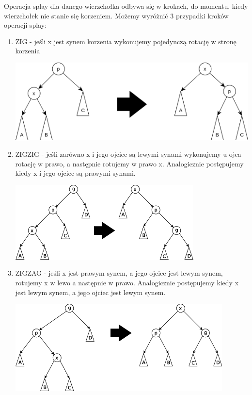 \documentclass[declaration,shortabstract]{iithesis}
\begin{document}
Operacja splay dla danego wierzchołka odbywa się w krokach, do momentu, kiedy wierzchołek nie stanie się korzeniem. Możemy wyróżnić 3 przypadki kroków operacji splay: 
\begin{enumerate} 

\item{ZIG - jeśli x jest synem korzenia wykonujemy pojedynczą rotację w stronę korzenia} 

\includegraphics[scale = 0.75]{Splay_tree_zig.png}

\item{ZIGZIG - jeśli zarówno x i jego ojciec są lewymi synami wykonujemy u ojca rotację w prawo, a następnie rotujemy w prawo x. Analogicznie postępujemy kiedy x i jego ojciec są prawymi synami.} 

\includegraphics[scale=0.75]{Zigzig.png}
\item{ZIGZAG - jeśli x jest prawym synem, a jego ojciec jest lewym synem, rotujemy x w lewo a następnie w prawo. Analogicznie postępujemy kiedy x  jest lewym synem, a jego ojciec jest lewym synem.} 

\includegraphics[scale=0.75]{Zigzag.png}
\end{enumerate}  
\end{document}
